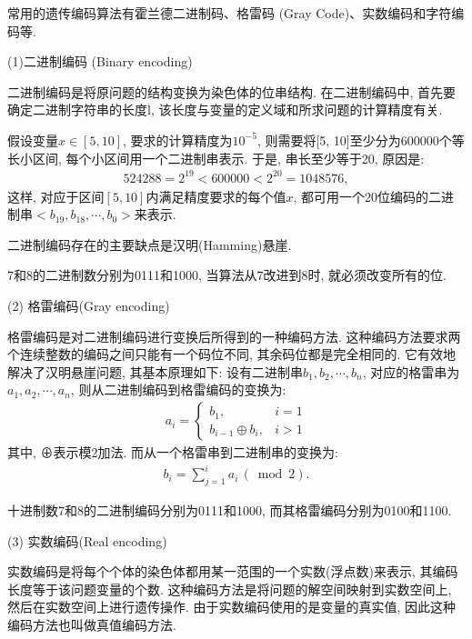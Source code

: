 常用的遗传编码算法有霍兰德二进制码、格雷码 (Gray Code)、实数编码和字符编码等.

(1)二进制编码 (Binary encoding)

二进制编码是将原问题的结构变换为染色体的位串结构. 在二进制编码中, 首先要确定二进制字符串的长度l, 该长度与变量的定义域和所求问题的计算精度有关.
\begin{example}
假设变量$x\in [5,10]$, 要求的计算精度为$10^{-5}$, 则需要将[5, 10]至少分为600000个等长小区间, 每个小区间用一个二进制串表示. 于是, 串长至少等于20, 原因是:
\begin{align*}
  524288=2^{19}<600000<2^{20}=1048576,
\end{align*}
这样, 对应于区间$[5,10]$内满足精度要求的每个值$x$, 都可用一个20位编码的二进制串$<b_{19},b_{18},\cdots,b_0>$来表示.
\end{example}

二进制编码存在的主要缺点是汉明(Hamming)悬崖.

\begin{example}
  7和8的二进制数分别为0111和1000, 当算法从7改进到8时, 就必须改变所有的位.
\end{example}

 (2) 格雷编码(Gray encoding)

格雷编码是对二进制编码进行变换后所得到的一种编码方法. 这种编码方法要求两个连续整数的编码之间只能有一个码位不同, 其余码位都是完全相同的. 它有效地解决了汉明悬崖问题, 其基本原理如下:
设有二进制串$b_1,b_2,\cdots,b_n$, 对应的格雷串为$a_1,a_2,\cdots,a_n$, 则从二进制编码到格雷编码的变换为:
\begin{align}
    a_{i}=\left\{\begin{array}{ll}{b_{1},} & {i=1} \\
  {b_{i-1} \oplus b_{i}}, & {i>1}\end{array}\right.
\end{align}
其中, ⊕表示模2加法. 而从一个格雷串到二进制串的变换为:
\begin{align}
    b_{i}=\sum_{j=1}^{i} a_{i}\,(\bmod 2).
\end{align}
\begin{example}
    十进制数7和8的二进制编码分别为0111和1000, 而其格雷编码分别为0100和1100.
\end{example}

 (3) 实数编码(Real encoding)


实数编码是将每个个体的染色体都用某一范围的一个实数(浮点数)来表示, 其编码长度等于该问题变量的个数.
这种编码方法是将问题的解空间映射到实数空间上, 然后在实数空间上进行遗传操作.
由于实数编码使用的是变量的真实值, 因此这种编码方法也叫做真值编码方法.

